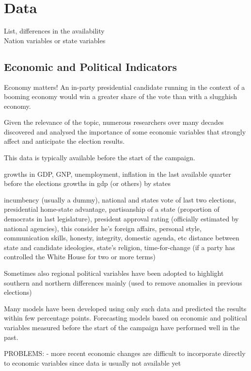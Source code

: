 \documentclass[
  12pt]{article}
\begin{document}
\hypertarget{data}{%
\section{Data}\label{data}}

List, differences in the availability\\
Nation variables or state variables

\hypertarget{economic-and-political-indicators}{%
\subsection{Economic and Political
Indicators}\label{economic-and-political-indicators}}

Economy matters! An in-party presidential candidate running in the
context of a booming economy would win a greater share of the vote than
with a slugghish economy.

Given the relevance of the topic, numerous researchers over many decades
discovered and analysed the importance of some economic variables that
strongly affect and anticipate the election results.

This data is typically available before the start of the campaign.

growths in GDP, GNP, unemployment, inflation in the last available
quarter before the elections growths in gdp (or others) by states

incumbency (usually a dummy), national and states vote of last two
elections, presidential home-state advantage, partisanship of a state
(proportion of democrats in last legislature), president approval rating
(officially estimated by national agencies), this consider he's foreign
affairs, personal style, communication skills, honesty, integrity,
domestic agenda, etc distance between state and candidate ideologies,
state's religion, time-for-change (if a party has controlled the White
House for two or more terms)

Sometimes also regional political variables have been adopted to
highlight southern and northern differences mainly (used to remove
anomalies in previous elections)

Many models have been developed using only such data and predicted the
results within few percentage points. Forecasting models based on
economic and political variables measured before the start of the
campaign have performed well in the past.

PROBLEMS: - more recent economic changes are difficult to incorporate
directly to economic variables since data is usually not available yet
\end{document}
